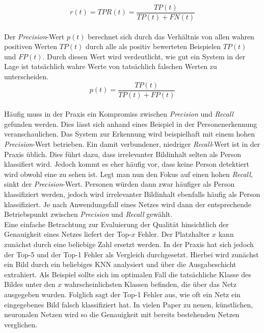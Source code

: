 		\begin{equation}
		r(t)=TPR(t)=\frac{TP(t)}{TP(t)+FN(t)}
		\label{eq: recall}
		\end{equation}\\
		
		Der \textit{Precision}-Wert $p(t)$ berechnet sich durch das Verhältnis von allen wahren positiven Werten $TP(t)$ durch alle als positiv bewerteten Beispielen $TP(t)$ und $FP(t)$. Durch diesen Wert wird verdeutlicht, wie gut ein System in der Lage ist tatsächlich wahre Werte von tatsächlich falschen Werten zu unterscheiden.\\
		
		\begin{equation}
		p(t)=\frac{TP(t)}{TP(t)+FP(t)}
		\label{eq: precision}
		\end{equation}\\
		
		Häufig muss in der Praxis ein Kompromiss zwischen \textit{Precision} und \textit{Recall} gefunden werden. Dies lässt sich anhand eines Beispiel in der Personenerkennung veranschaulichen. Das System zur Erkennung wird beispielhaft mit einem hohen \textit{Precision}-Wert betrieben. Ein damit verbundener, niedriger \textit{Recall}-Wert ist in der Praxis üblich. Dies führt dazu, dass irrelevanter Bildinhalt selten als Person klassifiert wird. Jedoch kommt es eher häufig vor, dass keine Person detektiert wird obwohl eine zu sehen ist. Legt man nun den Fokus auf einen hohen \textit{Recall}, sinkt der \textit{Precision}-Wert. Personen würden dann zwar häufiger als Person klassifiziert werden, jedoch wird irrelevanter Bildinhalt ebenfalls häufig als Person klassifiziert. Je nach Anwendungsfall eines Netzes wird dann der entsprechende Betriebspunkt zwischen \textit{Precision} und \textit{Recall} gewählt.\\
		
		Eine einfache Betrachtung zur Evaluierung der Qualität hinsichtlich der Genauigkeit eines Netzes liefert der Top-$x$ Fehler. Der Platzhalter $x$ kann zunächst durch eine beliebige Zahl ersetzt werden. In der Praxis hat sich jedoch der Top-5 und der Top-1 Fehler als Vergleich durchgesetzt. Hierbei wird zunächst ein Bild durch ein beliebiges KNN analysiert und über die Ausgabeschicht extrahiert. Als Beispiel sollte sich im optimalen Fall die tatsächliche Klasse des Bildes unter den $x$ wahrscheinlichsten Klassen befinden, die über das Netz ausgegeben wurden. Folglich sagt der Top-1 Fehler aus, wie oft ein Netz ein eingegebenes Bild falsch klassifiziert hat. In vielen Paper zu neuen, künstlichen, neuronalen Netzen wird so die Genauigkeit mit bereits bestehenden Netzen verglichen.
		

